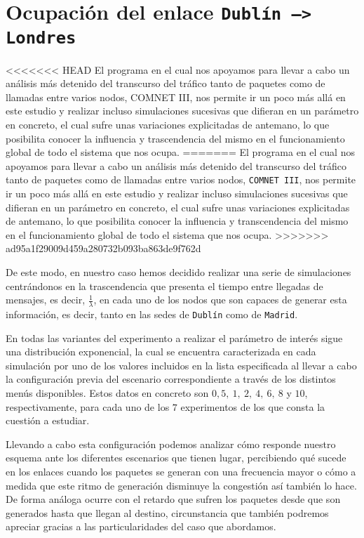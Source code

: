 \documentclass{article}[10pt]
\begin{document}
	\section{Ocupación del enlace \texttt{Dublín --> Londres}}
<<<<<<< HEAD
		El programa en el cual nos apoyamos para llevar a cabo un análisis más detenido del transcurso del tráfico tanto de paquetes como de llamadas entre varios nodos, COMNET III, nos permite ir un poco más allá en este estudio y realizar incluso simulaciones sucesivas que difieran en un parámetro en concreto, el cual sufre unas variaciones explicitadas de antemano, lo que posibilita conocer la influencia y trascendencia del mismo en el funcionamiento global de todo el sistema que nos ocupa.
=======
		El programa en el cual nos apoyamos para llevar a cabo un análisis más detenido del transcurso del tráfico tanto de paquetes como de llamadas entre varios nodos, \texttt{COMNET III}, nos permite ir un poco más allá en este estudio y realizar incluso simulaciones sucesivas que difieran en un parámetro en concreto, el cual sufre unas variaciones explicitadas de antemano, lo que posibilita conocer la influencia y transcendencia del mismo en el funcionamiento global de todo el sistema que nos ocupa.
>>>>>>> ad95a1f29009d459a280732b093ba863de9f762d

		De este modo, en nuestro caso hemos decidido realizar una serie de simulaciones centrándonos en la trascendencia que presenta el tiempo entre llegadas de mensajes, es decir, $\frac{1}{\lambda}$, en cada uno de los nodos que son capaces de generar esta información, es decir, tanto en las sedes de \texttt{Dublín} como de \texttt{Madrid}.

		En todas las variantes del experimento a realizar el parámetro de interés sigue una distribución exponencial, la cual se encuentra caracterizada en cada simulación por uno de los valores incluidos en la lista especificada al llevar a cabo la configuración previa del escenario correspondiente a través de los distintos menús disponibles. Estos datos en concreto son $0,5,\ 1,\ 2,\ 4,\ 6,\ 8$ y $10$, respectivamente, para cada uno de los $7$ experimentos de los que consta la cuestión a estudiar.

		Llevando a cabo esta configuración podemos analizar cómo responde nuestro esquema ante los diferentes escenarios que tienen lugar, percibiendo qué sucede en los enlaces cuando los paquetes se generan con una frecuencia mayor o cómo a medida que este ritmo de generación disminuye la congestión así también lo hace. De forma análoga ocurre con el retardo que sufren los paquetes desde que son generados hasta que llegan al destino, circunstancia que también podremos apreciar gracias a las particularidades del caso que abordamos.
\end{document}
